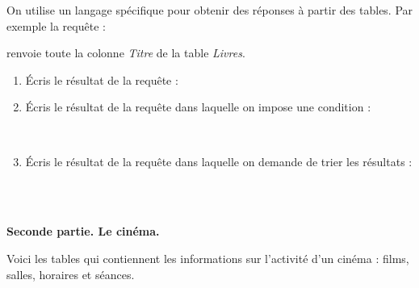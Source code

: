 \documentclass[class=report,crop=false, 12pt]{standalone}
\begin{document}
\begin{activite}

On utilise un langage spécifique pour obtenir des réponses à partir des tables.
Par exemple la requête :

  \indentation{}

renvoie toute la colonne \emph{Titre} de la table \emph{Livres}.
  
  
 \begin{enumerate}
  \item  Écris le résultat de la requête :
  
  \indentation{}
    
  \item Écris le résultat de la requête dans laquelle on impose une condition :
  
  \indentation{}\\
  \indentation\indentation{}
   
  \item Écris le résultat de la requête dans laquelle on demande de trier les résultats :
  
  \indentation{}\\
  \indentation\indentation{}\\
  \indentation\indentation{}    
  
  
\end{enumerate}

\end{activite}


\bigskip
\bigskip
\textbf{Seconde partie. Le cinéma.}


Voici les tables qui contiennent les informations sur l'activité d'un cinéma : films, salles, horaires et séances.

\bigskip
\end{document}
